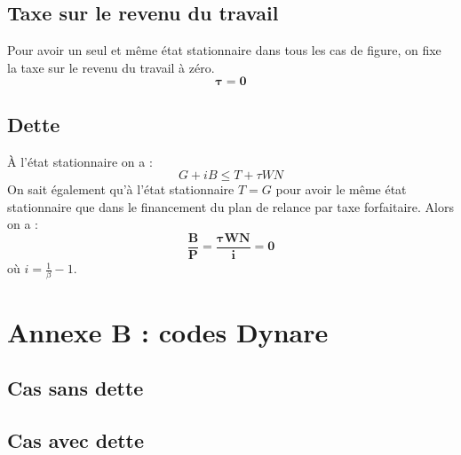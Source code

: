 \documentclass[12pt,letterpaper]{article}
\begin{document}
\subsection*{Taxe sur le revenu du travail}

Pour avoir un seul et même état stationnaire dans tous les cas de figure, on fixe la taxe sur le revenu du travail à zéro.
\begin{equation*}
\boldsymbol{\tau = 0}
\end{equation*}

\subsection*{Dette}

À l’état stationnaire on a :
\begin{equation*}
G + iB \leq T + \tau WN
\end{equation*}
On sait également qu’à l’état stationnaire $T = G$ pour avoir le même état stationnaire que dans le financement du plan de relance par taxe forfaitaire. Alors on a :
\begin{equation*}
\boldsymbol{\frac{B}{P} = \frac{\tau WN}{i} = 0}
\end{equation*}
où $i = \frac{1}{\beta} - 1$.

\newpage
\section*{Annexe B : codes Dynare}

\subsection*{Cas sans dette}


\subsection*{Cas avec dette}

\end{document}
